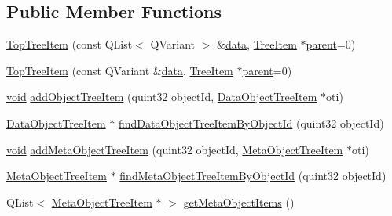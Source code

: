 \subsection*{\-Public \-Member \-Functions}
\begin{DoxyCompactItemize}
\item 
\hyperlink{group___u_a_v_object_browser_plugin_gaf9396b0e4b1f80d5d2eb271a4421aad9}{\-Top\-Tree\-Item} (const \-Q\-List$<$ \-Q\-Variant $>$ \&\hyperlink{group___u_a_v_object_browser_plugin_ga7c5708ae3cbba9c509f497c493beccb6}{data}, \hyperlink{class_tree_item}{\-Tree\-Item} $\ast$\hyperlink{group___u_a_v_object_browser_plugin_gaa3a7ba624312b6be70872634db291881}{parent}=0)
\item 
\hyperlink{group___u_a_v_object_browser_plugin_ga5c9d07784db08b50ef3905d2628f61e4}{\-Top\-Tree\-Item} (const \-Q\-Variant \&\hyperlink{group___u_a_v_object_browser_plugin_ga7c5708ae3cbba9c509f497c493beccb6}{data}, \hyperlink{class_tree_item}{\-Tree\-Item} $\ast$\hyperlink{group___u_a_v_object_browser_plugin_gaa3a7ba624312b6be70872634db291881}{parent}=0)
\item 
\hyperlink{group___u_a_v_objects_plugin_ga444cf2ff3f0ecbe028adce838d373f5c}{void} \hyperlink{group___u_a_v_object_browser_plugin_ga0bf12ffb3c9062983ea24eb70eb04d10}{add\-Object\-Tree\-Item} (quint32 object\-Id, \hyperlink{class_data_object_tree_item}{\-Data\-Object\-Tree\-Item} $\ast$oti)
\item 
\hyperlink{class_data_object_tree_item}{\-Data\-Object\-Tree\-Item} $\ast$ \hyperlink{group___u_a_v_object_browser_plugin_ga75602e9fca2d0a49f5463712ac8b1d30}{find\-Data\-Object\-Tree\-Item\-By\-Object\-Id} (quint32 object\-Id)
\item 
\hyperlink{group___u_a_v_objects_plugin_ga444cf2ff3f0ecbe028adce838d373f5c}{void} \hyperlink{group___u_a_v_object_browser_plugin_gad58a2bd3f036f91b012a93876993bdff}{add\-Meta\-Object\-Tree\-Item} (quint32 object\-Id, \hyperlink{class_meta_object_tree_item}{\-Meta\-Object\-Tree\-Item} $\ast$oti)
\item 
\hyperlink{class_meta_object_tree_item}{\-Meta\-Object\-Tree\-Item} $\ast$ \hyperlink{group___u_a_v_object_browser_plugin_gaa9790dc57ee25280838c1828d5991f92}{find\-Meta\-Object\-Tree\-Item\-By\-Object\-Id} (quint32 object\-Id)
\item 
\-Q\-List$<$ \hyperlink{class_meta_object_tree_item}{\-Meta\-Object\-Tree\-Item} $\ast$ $>$ \hyperlink{group___u_a_v_object_browser_plugin_gad60c68296e476007863dd24d950daf5e}{get\-Meta\-Object\-Items} ()
\end{DoxyCompactItemize}



